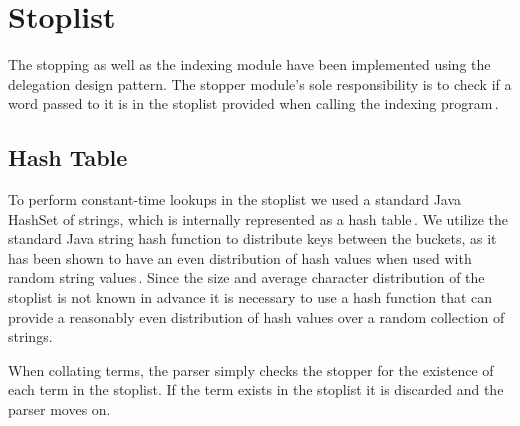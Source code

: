 
\section{Stoplist}
\label{sec:stopping}

The stopping as well as the indexing module have been implemented using the delegation design pattern. The stopper module's sole responsibility is to check if a word passed to it is in the stoplist provided when calling the indexing program\,\cite{princeton}.

\subsection{Hash Table}
To perform constant-time lookups in the stoplist we used a standard Java HashSet of strings, which is internally represented as a hash table\,\cite{hashset}. We utilize the standard Java string hash function to distribute keys between the buckets, as it has been shown to have an even distribution of hash values when used with random string values\,\cite{javamex}. Since the size and average character distribution of the stoplist is not known in advance it is necessary to use a hash function that can provide a reasonably even distribution of hash values over a random collection of strings.

When collating terms, the parser simply checks the stopper for the existence of each term in the stoplist. If the term exists in the stoplist it is discarded and the parser moves on.